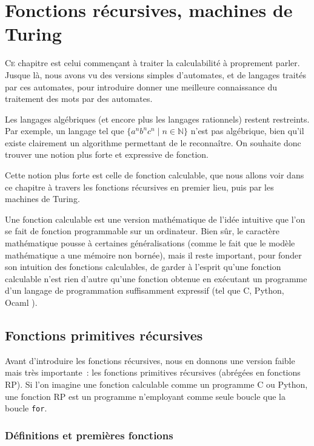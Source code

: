 \chapter{Fonctions récursives, machines de Turing}
\label{chp.recur}

\minitoc

\lettrine{C}{e} chapitre est celui commençant à traiter la calculabilité à
proprement parler. Jusque là, nous avons vu des versions simples d'automates, et
de langages traités par ces automates, pour introduire donner une meilleure
connaissance du traitement des mots par des automates.

Les langages algébriques (et encore plus les langages rationnels) restent
restreints. Par exemple, un langage tel que $\{a^nb^nc^n\mid n \in \mathbb N\}$
n'est pas algébrique, bien qu'il existe clairement un algorithme permettant de
le reconnaître. On souhaite donc trouver une notion plus forte et expressive de
fonction.

Cette notion plus forte est celle de fonction calculable, que nous allons voir
dans ce chapitre à travers les fonctions récursives en premier lieu, puis par
les machines de Turing.

Une fonction calculable est une version mathématique de l'idée intuitive que
l'on se fait de \og fonction programmable sur un ordinateur\fg. Bien sûr, le
caractère mathématique pousse à certaines généralisations (comme le fait que le
modèle mathématique a une mémoire non bornée), mais il reste important, pour
fonder son intuition des fonctions calculables, de garder à l'esprit qu'une
fonction calculable n'est rien d'autre qu'une fonction obtenue en exécutant un
programme d'un langage de programmation suffisamment expressif (tel que
C, Python, Ocaml ).

\section{Fonctions primitives récursives}

Avant d'introduire les fonctions récursives, nous en donnons une version faible
mais très importante~: les fonctions primitives récursives (abrégées en
fonctions RP). Si l'on imagine une fonction calculable comme un programme
C ou Python, une fonction RP est un programme n'employant comme seule boucle que
la boucle \texttt{for}.

\subsection{Définitions et premières fonctions}

